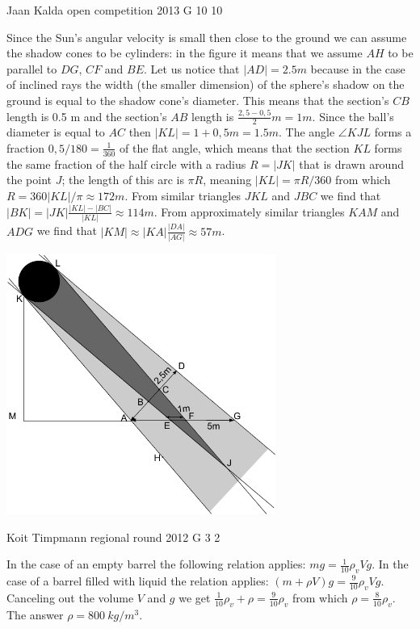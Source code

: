 \documentclass[11pt]{article}
\begin{document}
{Jaan Kalda} %
{open competition} %
{2013} %
{G 10} %
{10} %
{

\ifEngSolution
Since the Sun's angular velocity is small then close to the ground we can assume the shadow cones to be cylinders: in the figure it means that we assume $AH$ to be parallel to $DG$, $CF$ and $BE$. Let us notice that $|AD|=\SI{2,5}m$ because in the case of inclined rays the width (the smaller dimension) of the sphere's shadow on the ground is equal to the shadow cone's diameter. This means that the section's $CB$ length is 0.5 m and the section's $AB$ length is $\frac{2,5-0,5}2\SI{}m=\SI{1}m$. Since the ball's diameter is equal to $AC$ then $|KL|=1+0,5\SI{}m=\SI{1,5}m$. The angle $\angle KJL$ forms a fraction $0,5/180=\frac 1{360}$ of the flat angle, which means that the section $KL$ forms the same fraction of the half circle with a radius $R=|JK|$ that is drawn around the point $J$; the length of this arc is $\pi R$, meaning $|KL|=\pi R /360$ from which $R=360|KL|/\pi\approx \SI{172}m$. From similar triangles $JKL$ and $JBC$ we find that $|BK|=|JK|\frac{|KL|-|BC|}{|KL|}\approx \SI{114}m$. From approximately similar triangles $KAM$ and $ADG$ we find that $|KM|\approx |KA|\frac{|DA|}{|AG|}\approx \SI{57}m$.
\begin{center}
\includegraphics[width=250pt]{2013-lahg-10-pxike-pall-vari}%
\end{center}
\fi
}

{Koit Timpmann} %
{regional round} %
{2012} %
{G 3} %
{2} %
{

\ifEngSolution
In the case of an empty barrel the following relation applies: $mg=\frac 1{10}\rho_vVg$. In the case of a barrel filled with liquid the relation applies: $(m+\rho V)g=\frac 9{10}\rho_vVg$. Canceling out the volume $V$ and $g$ we get $\frac 1{10}\rho_v+\rho=\frac 9{10}\rho_v$ from which $\rho=\frac 8{10}\rho_v$. The answer $\rho= \SI{800}{kg/m^3}$.
\fi
}
\end{document}
